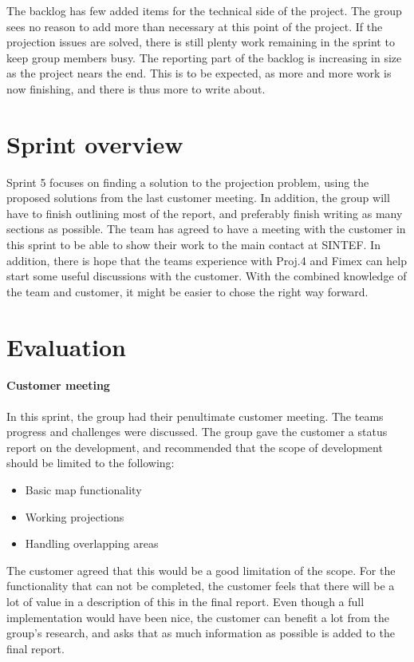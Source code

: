 \documentclass[11pt,a4paper,titlepage,oneside]{report}
\begin{document}
The backlog has few added items for the technical side of the project. The group sees no reason to add more than necessary at this point of the project. If the projection issues are solved, there is still plenty work remaining in the sprint to keep group members busy. The reporting part of the backlog is increasing in size as the project nears the end. This is to be expected, as more and more work is now finishing, and there is thus more to write about. 

\section{Sprint overview}
Sprint 5 focuses on finding a solution to the projection problem, using the proposed solutions from the last customer meeting. In addition, the group will have to finish outlining most of the report, and preferably finish writing as many sections as possible. The team has agreed to have a meeting with the customer in this sprint to be able to show their work to the main contact at SINTEF. In addition, there is hope that the teams experience with Proj.4 and \gls{Fimex} can help start some useful discussions with the customer. With the combined knowledge of the team and customer, it might be easier to chose the right way forward. 

\section{Evaluation}
\label{sec:Sprint5Evaluation}
\paragraph{Customer meeting}
In this sprint, the group had their penultimate customer meeting. The teams progress and challenges were discussed. The group gave the customer a status report on the development, and recommended that the scope of development should be limited to the following:

\begin{itemize}
\item Basic map functionality
\item Working projections
\item Handling overlapping areas
\end{itemize}

The customer agreed that this would be a good limitation of the scope. For the functionality that can not be completed, the customer feels that there will be a lot of value in a description of this in the final report. Even though a full implementation would have been nice, the customer can benefit a lot from the group's research, and asks that as much information as possible is added to the final report. 
\end{document}
